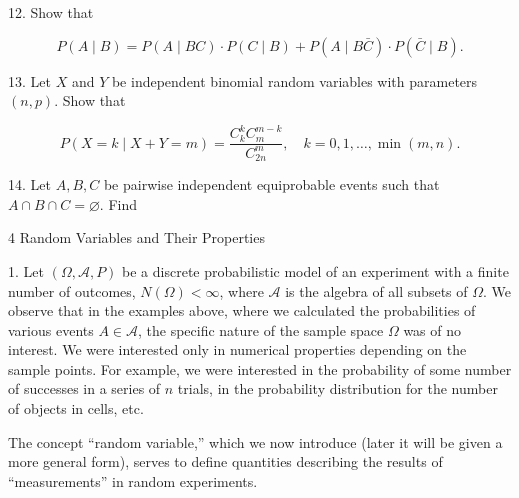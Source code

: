 12. Show that

$$P(A \mid B) = P(A \mid BC) \cdot P(C \mid B) + P(A \mid B \bar{C}) \cdot P(\bar{C} \mid B).$$

13. Let $X$ and $Y$ be independent binomial random variables with parameters $(n, p)$. Show that

$$P(X = k \mid X + Y = m) = \frac{C_k^k C_m^{m-k}}{C_{2n}^m}, \quad k = 0, 1, \ldots, \min(m, n).$$

14. Let $A, B, C$ be pairwise independent equiprobable events such that $A \cap B \cap C = \varnothing$. Find

4 Random Variables and Their Properties

1. Let $(\Omega, \mathcal{A}, P)$ be a discrete probabilistic model of an experiment with a finite number of outcomes, $N(\Omega) < \infty$, where $\mathcal{A}$ is the algebra of all subsets of $\Omega$. We observe that in the examples above, where we calculated the probabilities of various events $A \in \mathcal{A}$, the specific nature of the sample space $\Omega$ was of no interest. We were interested only in numerical properties depending on the sample points. For example, we were interested in the probability of some number of successes in a series of $n$ trials, in the probability distribution for the number of objects in cells, etc.

The concept “random variable,” which we now introduce (later it will be given a more general form), serves to define quantities describing the results of “measurements” in random experiments.
